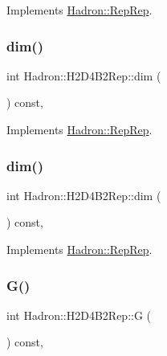 Implements \mbox{\hyperlink{structHadron_1_1RepRep_a92c8802e5ed7afd7da43ccfd5b7cd92b}{Hadron\+::\+Rep\+Rep}}.

\mbox{\label{structHadron_1_1H2D4B2Rep_a90884e34cded0501eed13e3083564c1d}} 
\subsubsection{\texorpdfstring{dim()}{dim()}\hspace{0.1cm}{\footnotesize\ttfamily [2/3]}}
{\footnotesize\ttfamily int Hadron\+::\+H2\+D4\+B2\+Rep\+::dim (\begin{DoxyParamCaption}{ }\end{DoxyParamCaption}) const\hspace{0.3cm}{\ttfamily [inline]}, {\ttfamily [virtual]}}



Implements \mbox{\hyperlink{structHadron_1_1RepRep_a92c8802e5ed7afd7da43ccfd5b7cd92b}{Hadron\+::\+Rep\+Rep}}.

\mbox{\label{structHadron_1_1H2D4B2Rep_a90884e34cded0501eed13e3083564c1d}} 
\subsubsection{\texorpdfstring{dim()}{dim()}\hspace{0.1cm}{\footnotesize\ttfamily [3/3]}}
{\footnotesize\ttfamily int Hadron\+::\+H2\+D4\+B2\+Rep\+::dim (\begin{DoxyParamCaption}{ }\end{DoxyParamCaption}) const\hspace{0.3cm}{\ttfamily [inline]}, {\ttfamily [virtual]}}



Implements \mbox{\hyperlink{structHadron_1_1RepRep_a92c8802e5ed7afd7da43ccfd5b7cd92b}{Hadron\+::\+Rep\+Rep}}.

\mbox{\label{structHadron_1_1H2D4B2Rep_a836bcf373e02587cc325b7b43dfd871f}} 
\subsubsection{\texorpdfstring{G()}{G()}\hspace{0.1cm}{\footnotesize\ttfamily [1/2]}}
{\footnotesize\ttfamily int Hadron\+::\+H2\+D4\+B2\+Rep\+::G (\begin{DoxyParamCaption}{ }\end{DoxyParamCaption}) const\hspace{0.3cm}{\ttfamily [inline]}, {\ttfamily [virtual]}}

